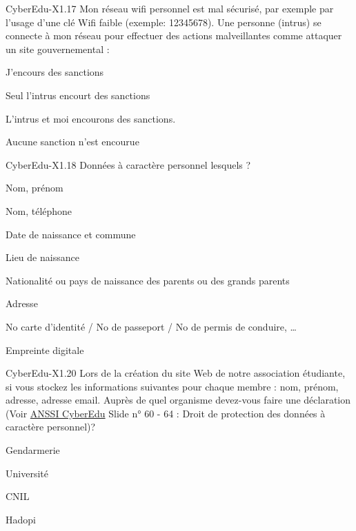 \begin{multi}[multiple=true]{CyberEdu-X1.17}
	Mon réseau wifi personnel est mal sécurisé, par exemple par l'usage d'une clé Wifi faible (exemple: 12345678). Une personne (intrus) se connecte à mon réseau  pour effectuer des actions malveillantes comme attaquer un site gouvernemental :
\item 	J'encours des sanctions
\item 	Seul l'intrus encourt des sanctions
\item* 	L'intrus et moi encourons des sanctions.
\item 	Aucune sanction n'est encourue
\end{multi}

\begin{multi}[multiple=true]{CyberEdu-X1.18}
	 Données à caractère personnel lesquels ?
\item*	Nom, prénom
\item* 	Nom, téléphone
\item* 	Date de naissance et commune
\item* 	Lieu de naissance
\item* 	Nationalité ou pays de naissance des parents ou des grands parents
\item* 	Adresse
\item* 	No carte d'identité / No de passeport / No de permis de conduire, …
\item* 	Empreinte digitale
\end{multi}

\begin{multi}[multiple=true]{CyberEdu-X1.20}
	Lors de la création du site Web de notre association étudiante, si vous stockez les informations suivantes pour chaque membre : nom, prénom, adresse, adresse email. Auprès de quel organisme devez-vous faire une déclaration (Voir \href{https://www.ssi.gouv.fr/administration/formations/cyberedu/contenu-pedagogique-cyberedu/}{ANSSI CyberEdu} Slide n° 60 - 64 : Droit de protection des données à caractère personnel)?
\item 	Gendarmerie
\item 	Université
\item* 	CNIL
\item 	Hadopi
\end{multi}

